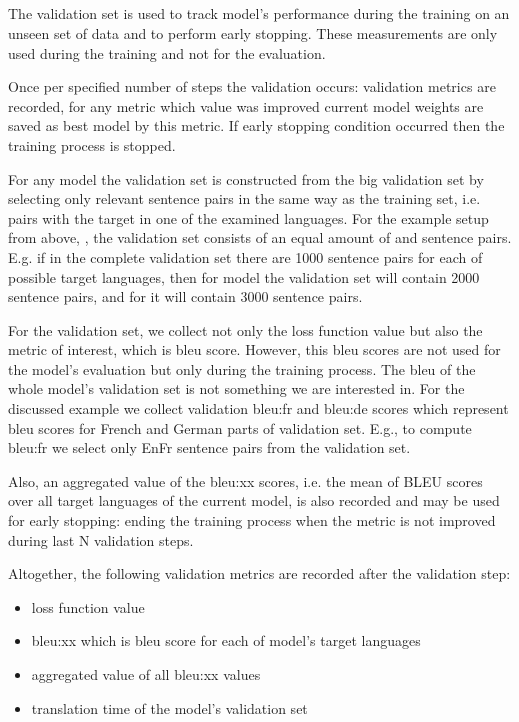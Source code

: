 \subsection{}
\label{subsection:validation}

The validation set is used to track model's performance during the training
on an unseen set of data and to perform early stopping.
These measurements are only used during the training and not for the evaluation.

Once per specified number of steps the validation occurs:
validation metrics are recorded, for any metric which value was
improved current model weights are saved as best model by this metric.
If early stopping condition occurred then the training process is stopped.

For any model the validation set is constructed from the big validation set
by selecting only relevant sentence pairs in the same way as the training set,
i.e. pairs with the target in one of the examined languages.
For the example setup from above, , the validation set
consists of an equal amount of  and  sentence pairs.
E.g. if in the complete validation set there are 1000 sentence pairs for
each of possible target languages, then for 
model the validation set will contain 2000 sentence pairs, and for
 it will contain 3000 sentence pairs.

For the validation set, we collect not only the loss function value
but also the metric of interest, which is \acrshort{bleu} score.
However, this \acrshort{bleu} scores are not used for the model's
evaluation but only during the training process.
The \acrshort{bleu} of the whole model's validation set
is not something we are interested in.
For the discussed example we collect validation bleu:fr and bleu:de scores
which represent \acrshort{bleu} scores for French and German
parts of validation set.
E.g., to compute bleu:fr we select only En\to{}Fr sentence pairs from the
validation set.

Also, an aggregated value of the bleu:xx scores, i.e. the mean of BLEU scores
over all target languages of the current model, is also recorded
and may be used for early stopping: ending the training process
when the metric is not improved during last N validation steps.

\begin{samepage}
Altogether, the following validation metrics are recorded after the
validation step:
\begin{itemize}
	\item loss function value
	\item bleu:xx which is \acrshort{bleu} score for each of
	model's target languages
	\item aggregated value of all bleu:xx values
	\item translation time of the model's validation set
\end{itemize}
\end{samepage}

